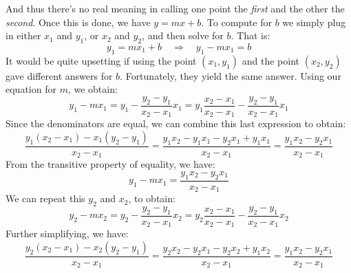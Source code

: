 \documentclass[crop=false,class=book,oneside]{standalone}                      %
\begin{document}
            And thus there's no real meaning in calling one point the
            \textit{first} and the other the \textit{second}.
            Once this is done, we have $y=mx+b$. To compute for $b$ we simply
            plug in either $x_{1}$ and $y_{1}$, or $x_{2}$ and $y_{2}$, and
            then solve for $b$. That is:
            \begin{equation}
                y_{1}=mx_{1}+b
                \quad\Longrightarrow\quad
                y_{1}-mx_{1}=b
            \end{equation}
            It would be quite upsetting if using the point $(x_{1},y_{1})$ and
            the point $(x_{2},y_{2})$ gave different answers for $b$.
            Fortunately, they yield the same answer.
            Using our equation for $m$, we obtain:
            \begin{equation}
                y_{1}-mx_{1}=y_{1}-\frac{y_{2}-y_{1}}{x_{2}-x_{1}}x_{1}
                            =y_{1}\frac{x_{2}-x_{1}}{x_{2}-x_{1}}-
                                  \frac{y_{2}-y_{1}}{x_{2}-x_{1}}x_{1}
            \end{equation}
            Since the denominators are equal, we can combine this last
            expression to obtain:
            \begin{equation}
                \frac{y_{1}(x_{2}-x_{1})-x_{1}(y_{2}-y_{1})}{x_{2}-x_{1}}
                    =\frac{y_{1}x_{2}-y_{1}x_{1}-y_{2}x_{1}+y_{1}x_{1}}
                          {x_{2}-x_{1}}
                    =\frac{y_{1}x_{2}-y_{2}x_{1}}{x_{2}-x_{1}}
            \end{equation}
            From the transitive property of equality, we have:
            \begin{equation}
                y_{1}-mx_{1}=\frac{y_{1}x_{2}-y_{2}x_{1}}{x_{2}-x_{1}}
            \end{equation}
            We can repeat this $y_{2}$ and $x_{2}$, to obtain:
            \begin{equation}
                y_{2}-mx_{2}=y_{2}-\frac{y_{2}-y_{1}}{x_{2}-x_{1}}x_{2}
                            =y_{2}\frac{x_{2}-x_{1}}{x_{2}-x_{1}}-
                                  \frac{y_{2}-y_{1}}{x_{2}-x_{1}}x_{2}
            \end{equation}
            Further simplifying, we have:
            \begin{equation}
                \frac{y_{2}(x_{2}-x_{1})-x_{2}(y_{2}-y_{1})}{x_{2}-x_{1}}
                    =\frac{y_{2}x_{2}-y_{2}x_{1}-y_{2}x_{2}+y_{1}x_{2}}
                          {x_{2}-x_{1}}
                    =\frac{y_{1}x_{2}-y_{2}x_{1}}{x_{2}-x_{1}}
            \end{equation}
\end{document}
